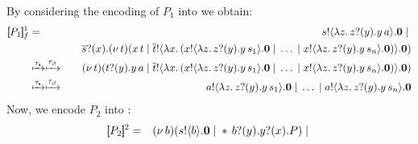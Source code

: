 \documentclass[runningheads]{llncs}
\begin{document}
{{%
By considering the encoding of $P_1$ into \HO   
we obtain:
\begin{eqnarray*}
[\!\![P_1]\!\!]^{1}_f & = &  	s ! \langle \lambda z.\,z ? (y) . y\, {a} \rangle . \mathbf{0} \;|\; \\
& & \quad  \overline{s} ? (x) . (\nu\, t)(x\, {t} \;|\; \overline{t} ! \langle \lambda x.\,(x ! \langle \lambda z.\,z ? (y) . y\, {s_1} \rangle . \mathbf{0} \;|\; \dots \;|\; x ! \langle \lambda z.\,z ? (y) . y\, {s_n} \rangle . \mathbf{0}) \rangle . \mathbf{0})\\
	& \xmapsto{\tau_{\mathsf{s}}} \xmapsto{\tau_{\beta}} & 
	(\nu\, t)(t ? (y) . y\, {a} \;|\; \overline{t} ! \langle \lambda x.\,(x ! \langle \lambda z.\,z ? (y) . y\, {s_1} \rangle . \mathbf{0} \;|\; \dots \;|\; x ! \langle \lambda z.\,z ? (y) . y\, {s_n} \rangle . \mathbf{0}) \rangle . \mathbf{0})\\
	& \xmapsto{\tau_{\mathsf{s}}}\xmapsto{\tau_{\beta}}  & 
	a ! \langle \lambda z.\,z ? (y) . y\, {s_1} \rangle . \mathbf{0} \;|\; \dots \;|\; a ! \langle \lambda z.\,z ? (y) . y\, {s_n} \rangle . \mathbf{0}
\end{eqnarray*}
Now, we encode $P_2$ into \sessp:
\begin{eqnarray*}
\pmap{P_2}{2} & = & 	\newsp{b}{\bout{s}{b} \inact \Par \repl \binp{b}{y} \binp{y}{x} P} \Par \\

\end{eqnarray*}}}
\end{document}
